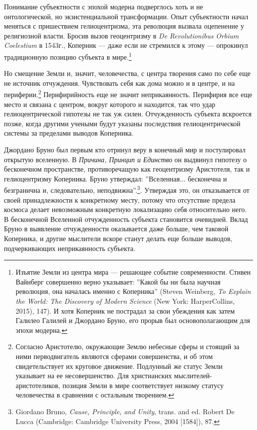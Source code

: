 \documentclass[12pt]{book}
\begin{document}
Понимание субъектности с эпохой модерна подверглось хоть и не онтологической, но экзистенциальной трансформации. Опыт субъектности начал меняться с пришествием гелиоцентризма, эта революция вызвала оцепенение у религиозной власти. Бросив вызов геоцентризму в \textit{De Revolutionibus Orbium Coelestium} в 1543г., Коперник --- даже если не стремился к этому --- опрокинул традиционную позицию субъекта в мире.\footnote{Изъятие Земли из центра мира --- решающее событие современности. Стивен Вайнберг совершенно верно указывает: ''Какой бы ни была научная революция, она началась именно с Коперника'' (Steven Weinberg, \textit{To Explain the World: The Discovery of Modern Science} (New York: HarperCollins, 2015), 147). И хотя Коперник не пострадал за свои убеждения как затем Галилео Галилей и Джордано Бруно, его прорыв был основополагающим для эпохи модерна.}

Но смещение Земли и, значит, человечества, с центра творения само по себе еще не источник отчуждения. Чувствовать себя как дома можно и в центре, и на периферии.\footnote{Согласно Аристотелю, окружающие Землю небесные сферы и стоящий за ними перводвигатель являются сферами совершенства, и об этом свидетельствует их круговое движение. Подлунный же статус Земли указывает на ее несовершенство. Для христианских мыслителей-аристотеликов, позиция Земли в мире соответствует низкому статусу человечества в сравнении с остальным творением.} Перифирийность еще не значит неприкаянность. Перифирия все еще место и связана с центром, вокруг которого и находится, так что удар гелиоцентрической гипотезы не так уж силен. Отчужденность субъекта вскроется позже, когда другими учеными будут указаны последствия гелиоцентрической системы за пределами выводов Коперника.

Джордано Бруно был первым кто отринул веру в конечный мир и постулировал открытую вселенную. В \textit{Причина, Принцип и Единство} он выдвинул гипотезу о бесконечном пространстве, противоречащую как геоцентризму Аристотеля, так и гелиоцентризму Коперника. Бруно утверждал: ''Вселенная... бесконечна и безгранична и, следовательно, неподвижна''.\footnote{Giordano Bruno, \textit{Cause, Principle, and Unity}, trans. and ed. Robert De Lucca (Cambridge: Cambridge University Press, 2004 [1584]), 87.}. Утверждая это, он отказывается от своей принадлежности к конкретному месту, потому что отсутствие предела космоса делает невозможным конкретную локализацию себя относительно него. В бесконечной Вселенной отчужденность субъекта становится очевидней. Вклад Бруно в выявление отчужденности оказывается даже больше, чем таковой Коперника, и другие мыслители вскоре станут делать еще больше выводов, подчеркивающих неприкаянность субъекта.
\end{document}
